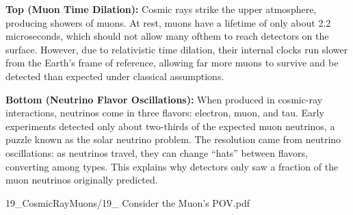 \begin{SideNotePage}{

    \textbf{Top (Muon Time Dilation):} Cosmic rays strike the upper atmosphere, producing showers of muons. At rest, muons have a lifetime of only about 2.2 microseconds, which should not allow many ofthem to reach detectors on the surface. However, due to relativistic time dilation, their internal clocks run slower from the Earth’s frame of reference, allowing far more muons to survive and be detected than expected under classical assumptions. \par
    \textbf{Bottom (Neutrino Flavor Oscillations):} When produced in cosmic-ray interactions, neutrinos come in three flavors: electron, muon, and tau. Early experiments detected only about two-thirds of the expected muon neutrinos, a puzzle known as the solar neutrino problem. The resolution came from neutrino oscillations: as neutrinos travel, they can change “hats” between flavors, converting among types. This explains why detectors only saw a fraction of the muon neutrinos originally predicted. \par

}{19_CosmicRayMuons/19_ Consider the Muon’s POV.pdf}
\end{SideNotePage}
